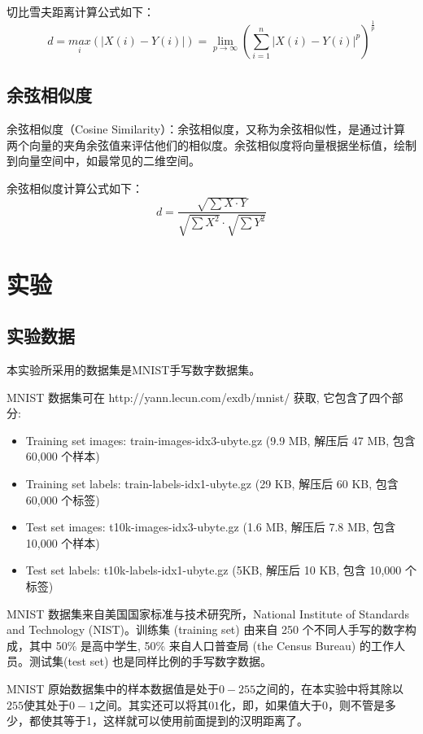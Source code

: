 \documentclass{cugrep}
\begin{document}
切比雪夫距离计算公式如下：
\begin{equation}
	d = \underset{i}{max}(|X(i) - Y(i)|) = \lim_{p\to\infty}\left(\sum_{i=1}^{n}|X(i) - Y(i)|^{p}\right)^{\frac{1}{p}}
\end{equation}
\subsection{余弦相似度}
余弦相似度（Cosine Similarity）：余弦相似度，又称为余弦相似性，是通过计算两个向量的夹角余弦值来评估他们的相似度。余弦相似度将向量根据坐标值，绘制到向量空间中，如最常见的二维空间。

余弦相似度计算公式如下：
\begin{equation}
	d = \frac{
				\sqrt{\sum X\cdot Y}
			 }{
			 	\sqrt{\sum X^{2}}\cdot \sqrt{\sum Y^{2}}
			 }
\end{equation}


\section{实验}
\subsection{实验数据}
本实验所采用的数据集是MNIST手写数字数据集。

MNIST 数据集可在 http://yann.lecun.com/exdb/mnist/ 获取, 它包含了四个部分:

\begin{itemize}[itemindent=1em]
	\item Training set images: train-images-idx3-ubyte.gz (9.9 MB, 解压后 47 MB, 包含 60,000 个样本)
	\item Training set labels: train-labels-idx1-ubyte.gz (29 KB, 解压后 60 KB, 包含 60,000 个标签)
	\item Test set images: t10k-images-idx3-ubyte.gz (1.6 MB, 解压后 7.8 MB, 包含 10,000 个样本)
	\item Test set labels: t10k-labels-idx1-ubyte.gz (5KB, 解压后 10 KB, 包含 10,000 个标签)
\end{itemize}

MNIST 数据集来自美国国家标准与技术研究所，National Institute of Standards and Technology (NIST)。训练集 (training set) 由来自 250 个不同人手写的数字构成，其中 50\% 是高中学生, 50\% 来自人口普查局 (the Census Bureau) 的工作人员。测试集(test set) 也是同样比例的手写数字数据。

MNIST 原始数据集中的样本数据值是处于$0-255$之间的，在本实验中将其除以$255$使其处于$0-1$之间。其实还可以将其$01$化，即，如果值大于0，则不管是多少，都使其等于1，这样就可以使用前面提到的汉明距离了。
\end{document}
